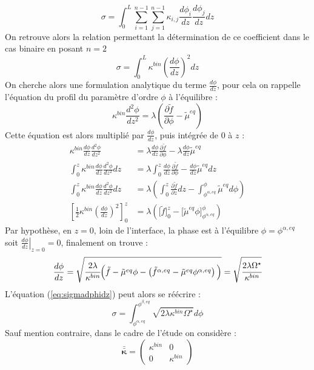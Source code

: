 \begin{equation}
\sigma = \int_0^L \sum_{i=1}^{n-1}\sum_{j=1}^{n-1} \kappa_{i,j}\frac{d\phi_i}{dz}\frac{d\phi_j}{dz}dz
\end{equation}
On retrouve alors la relation permettant la détermination de ce coefficient dans le cas binaire en posant $n=2$
\begin{equation}
\sigma = \int_0^L\kappa^{bin}\left(\frac{d\phi}{dz}\right)^2dz
\label{eq:sigmadphidz}
\end{equation}
On cherche alors une formulation analytique du terme $\frac{d\phi}{dz}$, pour cela on rappelle l'équation du profil du paramètre d'ordre $\phi$ à l'équilibre : 
\begin{equation}
\kappa^{bin} \frac{d^2\phi}{dz^2} =\lambda\left(\frac{\partial \tilde{f}}{\partial \phi}- \tilde{\mu}^{eq}\right)
\end{equation}
Cette équation est alors multiplié par $\frac{d\phi}{dz}$, puis intégrée de 0 à $z$ :
\begin{align*}
\kappa^{bin} \frac{d\phi}{dz}\frac{d^2\phi}{dz^2} &=\lambda\frac{d\phi}{dz}\frac{\partial \tilde{f}}{\partial \phi}- \lambda\frac{d\phi}{dz}\tilde{\mu}^{eq} \\
\int_0^z \kappa^{bin} \frac{d\phi}{dz}\frac{d^2\phi}{dz^2} dz & = \lambda\int_0^z \frac{d\phi}{dz}\frac{\partial \tilde{f}}{\partial \phi}- \frac{d\phi}{dz}\tilde{\mu}^{eq} dz \\
\int_0^z \kappa^{bin} \frac{d\phi}{dz}\frac{d^2\phi}{dz^2} dz & = \lambda\left(\int_0^z \frac{\partial \tilde{f}}{\partial z} dz- \int_{\phi^{\alpha,eq}}^\phi\tilde{\mu}^{eq} d\phi \right)\\
\left[\frac{1}{2}\kappa^{bin} \left(\frac{d\phi}{dz}\right)^2 \right]_0^z & = \lambda \left(\Big [ \tilde{f}\Big ]_0^z - \Big [ \tilde{\mu}^{eq} \phi\Big ]_{\phi^{\alpha,eq}}^\phi\right)
\end{align*}
Par hypothèse, en $z=0$, loin de l'interface, la phase est à l'équilibre $\phi = \phi^{\alpha,eq}$ soit $\displaystyle \left.\frac{d\phi}{dz}\right|_{z=0} = 0$, finalement on trouve :
\begin{equation}
	\frac{d\phi}{dz} = \sqrt{\cfrac{2\lambda}{\kappa^{bin}}\Big (\tilde{f} - \tilde{\mu}^{eq} \phi - \left( \tilde{f}^{\alpha,eq} - \tilde{\mu}^{eq} \phi^{\alpha,eq}\right) \Big )} = \sqrt{\cfrac{2\lambda\Omega^{\star}}{\kappa^{bin}}}	
\end{equation}
L'équation (\ref{eq:sigmadphidz}) peut alors se réécrire :
\begin{equation}
\sigma = \int_{\phi^{\alpha,eq}}^{\phi^{\beta,eq}} \sqrt{{2\lambda\kappa^{bin}\Omega^{\star}}}	 d\phi
\end{equation}
Sauf mention contraire, dans le cadre de l'étude on considère :
\begin{equation}
\bm{\bar{\bar{\kappa}}} =    \begin{pmatrix} 
\kappa^{bin}& 0 \\ 
0				& \kappa^{bin} 
\end{pmatrix} 
\end{equation}
